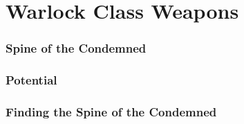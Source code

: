 \section{Warlock Class Weapons}

\subsubsection{Spine of the Condemned}

\subsubsection{Potential}

\subsubsection{Finding the Spine of the Condemned}